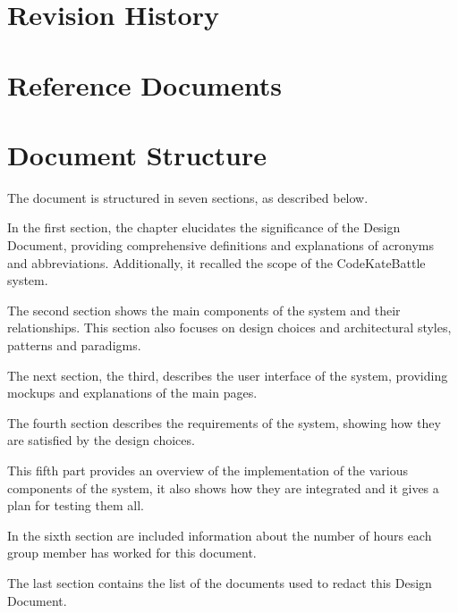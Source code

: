 \section{Revision History}
\label{sec:revision_history}%

\section{Reference Documents}
\label{sec:reference_documents}%

\section{Document Structure}
\label{sec:doc_structure}%
The document is structured in seven sections, as described below.

In the first section, the chapter elucidates the significance of the Design 
Document, providing comprehensive definitions and explanations of acronyms and abbreviations. Additionally, it recalled the scope of the CodeKateBattle system.

The second section shows the main components of the system and their relationships. This section also focuses on design choices and architectural styles, patterns and paradigms.

The next section, the third, describes the user interface of the system, providing mockups and explanations of the main pages.

The fourth section describes the requirements of the system, showing how they are satisfied by the design choices.

This fifth part provides an overview of the implementation of the various components of the system, it also shows how they are integrated and it gives a plan for testing them all.

In the sixth section are included information about the number of hours each group member has worked for this document.

The last section contains the list of the documents used to redact this Design Document.
 

